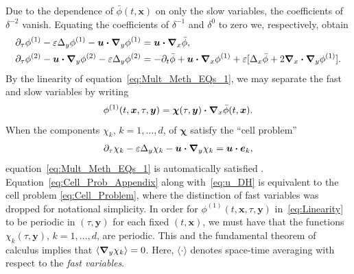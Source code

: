\documentclass[leqno,onefignum,onetabnum]{siamltex1213}
\newcommand\bnabla{\mbox{\boldmath${\nabla}$}}
\providecommand\bcdot{\boldsymbol{\cdot}}
\newcommand{\vecx}{\boldsymbol{x}}
\newcommand{\vecy}{\boldsymbol{y}}
\newcommand{\vecu}{\boldsymbol{u}}
\newcommand{\vece}{\boldsymbol{e}}
\newcommand{\vecchi}{\boldsymbol{\chi}}
\begin{document}
Due to the dependence of $\bar{\phi}(t,\vecx)$ on only the
slow variables, the coefficients of $\delta^{-2}$ vanish. Equating the
coefficients of $\delta^{-1}$ and $\delta^0$ to zero we, respectively, obtain 
%
\begin{align}
  \label{eq:Mult_Meth_EQs_1}
  &\partial_\tau\phi^{(1)}-\varepsilon\Delta_y\phi^{(1)}-\vecu \bcdot\bnabla _y\phi^{(1)}=\vecu \bcdot\bnabla _x\bar{\phi},
  \\
  \label{eq:Mult_Meth_EQs_2}
  &\partial_\tau\phi^{(2)}-\vecu \bcdot\bnabla _y\phi^{(2)}-\varepsilon\Delta_y\phi^{(2)}
  =-\partial_t\bar{\phi}+\vecu \bcdot\bnabla _x\phi^{(1)}+\varepsilon[\Delta_x\bar{\phi}+2\bnabla _x\bcdot\bnabla _y\phi^{(1)}].
\end{align}
%
By the linearity of equation~\eqref{eq:Mult_Meth_EQs_1}, we may
separate the fast and slow variables by writing
\cite{McLaughlin:SIAM_JAM:780}
%
\begin{align}\label{eq:Linearity}
  \phi^{(1)}(t,\vecx,\tau,\vecy)
    =%
    \vecchi(\tau,\vecy)\bcdot\bnabla _x\bar{\phi}(t,\vecx).
\end{align}
%
When
the components $\chi_k$, $k=1,\ldots,d$, of $\vecchi$ satisfy the ``cell
problem''  
%
\begin{align}\label{eq:Cell_Prob_Appendix}
  \partial_\tau\chi_k-\varepsilon\Delta_y\chi_k-\vecu \bcdot\bnabla _y\chi_k=\vecu \bcdot\vece _k,
\end{align}
%
equation~\eqref{eq:Mult_Meth_EQs_1} is automatically satisfied
\cite{McLaughlin:SIAM_JAM:780}. Equation~\eqref{eq:Cell_Prob_Appendix}
along with~\eqref{eq:u_DH} is equivalent to the cell problem
\eqref{eq:Cell_Problem}, where the distinction of fast variables was
dropped for notational simplicity. In order for
$\phi^{(1)}(t,\vecx,\tau,\vecy)$ in~\eqref{eq:Linearity} to be periodic  
in $(\tau,\vecy)$ for each fixed $(t,\vecx)$, we must have that the
functions $\chi_k(\tau,\vecy)$, $k=1,\ldots,d$, are periodic. This and the
fundamental theorem of calculus implies that $\langle\bnabla _y\chi_k\rangle=0$. Here,
$\langle\cdot\rangle$ denotes space-time averaging with respect to the \emph{fast
  variables}.    
\end{document}

